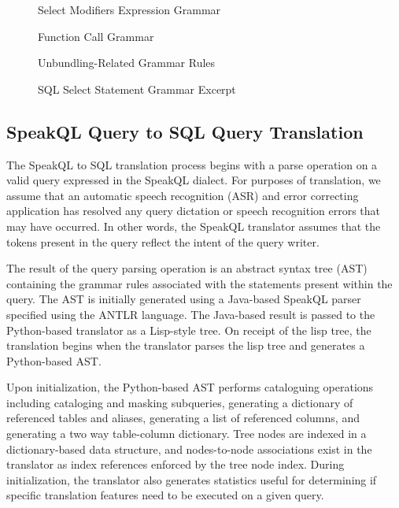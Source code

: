 \begin{figure}
  \selectModifierTable
  \caption{Select Modifiers Expression Grammar}
  \label{fig:selectmodifiergrammar}
\end{figure}  

\begin{figure}
  \naturalFunctionTable
  \caption{Function Call Grammar}
  \label{fig:functiongrammar}
\end{figure}  

\begin{figure}
  \unbundleQueryTable
  \caption{Unbundling-Related Grammar Rules}
  \label{fig:unbundlegrammar}
\end{figure}  

\begin{figure}
  \sqlSelectStatementTable
  \caption{SQL Select Statement Grammar Excerpt}
  \label{fig:sqlselectgrammar}
\end{figure}

\subsection{SpeakQL Query to SQL Query Translation}

The SpeakQL to SQL translation process begins with a parse operation on a valid query expressed in the SpeakQL dialect. For purposes of translation, we assume that an automatic speech recognition (ASR) and error correcting application has resolved any query dictation or speech recognition errors that may have occurred. In other words, the SpeakQL translator assumes that the tokens present in the query reflect the intent of the query writer. 

The result of the query parsing operation is an abstract syntax tree (AST) containing the grammar rules associated with the statements present within the query. The AST is initially generated using a Java-based SpeakQL parser specified using the ANTLR \cite{Parr2014} language. The Java-based result is passed to the Python-based translator as a Lisp-style tree. On receipt of the lisp tree, the translation begins when the translator parses the lisp tree and generates a Python-based AST.

Upon initialization, the Python-based AST performs cataloguing operations including cataloging and masking subqueries, generating a dictionary of referenced tables and aliases, generating a list of referenced columns, and generating a two way table-column dictionary. Tree nodes are indexed in a dictionary-based data structure, and nodes-to-node associations exist in the translator as index references enforced by the tree node index. During initialization, the translator also generates statistics useful for determining if specific translation features need to be executed on a given query.

